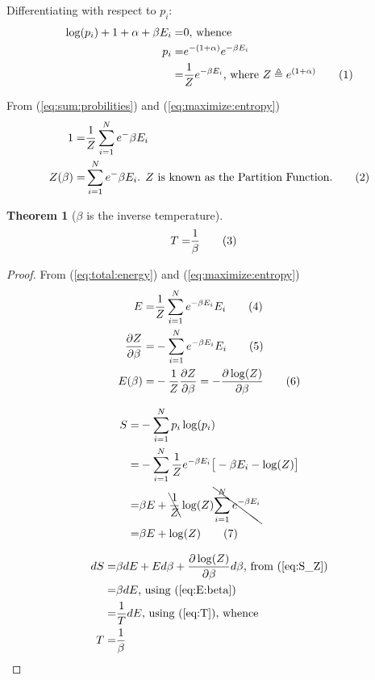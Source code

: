 \documentclass[]{article}
\newcommand\numberthis{\addtocounter{equation}{1}\tag{\theequation}}
\newtheorem{thm}{Theorem}
\begin{document}
Differentiating with respect to $p_i$:
\begin{align*}
\log(p_i)+1 + \alpha +\beta E_i=&0\text{, whence}\\
p_i =& e^{-(1+\alpha)} e^{-\beta E_i}\\
=& \frac{1}{Z} e^{-\beta E_i}\text{, where $Z\triangleq e^{(1+\alpha)}$} \numberthis\label{eq:maximize:entropy}
\end{align*}

From (\ref{eq:sum:probilities}) and (\ref{eq:maximize:entropy})
\begin{align*}
1 =& \frac{1}{Z}  \sum_{i=1}^{N} e^-{\beta E_i}\\
Z(\beta) =& \sum_{i=1}^{N} e^-{\beta E_i} \text{. $Z$ is known as the Partition Function.} \numberthis \label{eq:partition:function}
\end{align*}

\begin{thm}[$\beta$ is the inverse temperature]\label{thm:inverseT}
	\begin{align*}
		T =& \frac{1}{\beta}\numberthis\label{eq:inverseT}
	\end{align*}
\end{thm}

\begin{proof}
	From (\ref{eq:total:energy}) and (\ref{eq:maximize:entropy})
	\begin{align*}
	E =& \frac{1}{Z}  \sum_{i=1}^{N} e^{-\beta E_i} E_i \numberthis \label{eq:E}\\
	\frac{\partial Z}{\partial \beta} =& - \sum_{i=1}^{N} e^{-\beta E_i} E_i \numberthis \label{eq:dZ}\\
	E(\beta) =& - \frac{1}{Z} \frac{\partial Z}{\partial \beta} = - \frac{\partial \log(Z)}{\partial \beta} \numberthis \label{eq:E:beta}
	\end{align*}
	
	\begin{align*}
	S =& -\sum_{i=1}^{N} p_i \log(p_i)\\
	=& - \sum_{i=1}^{N} \frac{1}{Z} e^{- \beta E_i}\big[- \beta E_i -\log(Z)\big]\\
	=& \beta E +  \bcancel{\frac{1}{Z}} \log(Z)  \bcancel{\sum_{i=1}^{N} e^{-\beta E_i}}\\
	=& \beta E +   \log(Z)  \numberthis \label{eq:S_Z}
	\end{align*}
	
	\begin{align*}
	dS =& \beta dE + E d\beta + \frac{\partial \log(Z)}{\partial \beta} d\beta \text{, from (\ref{eq:S_Z})}\\
	=& \beta dE \text{, using (\ref{eq:E:beta})}\\
	=& \frac{1}{T} dE \text{, using (\ref{eq:T})}\text{, whence}\\
	T =& \frac{1}{\beta}
	\end{align*}
\end{proof}
\end{document}
